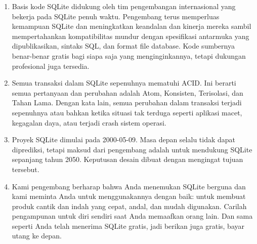 \begin{enumerate}
				\item Basis kode SQLite didukung oleh tim pengembangan internasional yang bekerja pada SQLite penuh waktu. Pengembang terus memperluas kemampuan SQLite dan meningkatkan keandalan dan kinerja mereka sambil mempertahankan kompatibilitas mundur dengan spesifikasi antarmuka yang dipublikasikan, sintaks SQL, dan format file database. Kode sumbernya benar-benar gratis bagi siapa saja yang menginginkannya, tetapi dukungan profesional juga tersedia.
				\item Semua transaksi dalam SQLite sepenuhnya mematuhi ACID. Ini berarti semua pertanyaan dan perubahan adalah Atom, Konsisten, Terisolasi, dan Tahan Lama. Dengan kata lain, semua perubahan dalam transaksi terjadi sepenuhnya atau bahkan ketika situasi tak terduga seperti aplikasi macet, kegagalan daya, atau terjadi crash sistem operasi.
				\item Proyek SQLite dimulai pada 2000-05-09. Masa depan selalu tidak dapat diprediksi, tetapi maksud dari pengembang adalah untuk mendukung SQLite sepanjang tahun 2050. Keputusan desain dibuat dengan mengingat tujuan tersebut.
				\item Kami pengembang berharap bahwa Anda menemukan SQLite berguna dan kami meminta Anda untuk menggunakannya dengan baik: untuk membuat produk cantik dan indah yang cepat, andal, dan mudah digunakan. Carilah pengampunan untuk diri sendiri saat Anda memaafkan orang lain. Dan sama seperti Anda telah menerima SQLite gratis, jadi berikan juga gratis, bayar utang ke depan.
			\end{enumerate}
			
\cite{owens2010sqlite}
\cite{newman2004sqlite}
\cite{kreibich2010using}
\cite{kang2013x}
\cite{jeon2012recovery}
\cite{lee2012creating}

